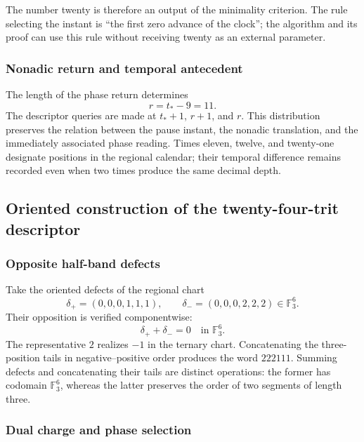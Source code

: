 The number twenty is therefore an output of the minimality criterion. The rule
selecting the instant is ``the first zero advance of the clock''; the
algorithm and its proof can use this rule without receiving twenty as
an external parameter.

\subsubsection{Nonadic return and temporal antecedent}

The length of the phase return determines
\begin{equation}
 r=t_*-9=11.
 \label{eq:kdes-retorno}
\end{equation}
The descriptor queries are made at $t_*+1$, $r+1$, and $r$.
This distribution preserves the relation between the pause instant, the
nonadic translation, and the immediately associated phase reading. Times
eleven, twelve, and twenty-one designate positions in the regional
calendar; their temporal difference remains recorded even when two
times produce the same decimal depth.

\subsection{Oriented construction of the twenty-four-trit descriptor}

\subsubsection{Opposite half-band defects}

Take the oriented defects of the regional chart
\[
 \delta_+=(0,0,0,1,1,1),\qquad
 \delta_-=(0,0,0,2,2,2)\in\mathbb F_3^6.
\]
Their opposition is verified componentwise:
\[
 \delta_++\delta_-=0\quad\text{in }\mathbb F_3^6.
\]
The representative $2$ realizes $-1$ in the ternary chart. Concatenating the three-position tails in negative--positive order produces the word $222111$. Summing defects and concatenating their tails are distinct operations: the former has codomain $\mathbb F_3^6$, whereas the latter preserves the order of two segments of length three.

\subsubsection{Dual charge and phase selection}


